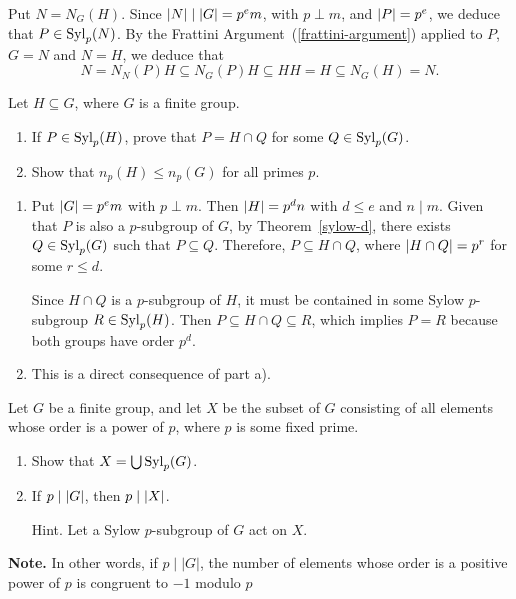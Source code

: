 \begin{solution} Put $N=N_G(H)$. Since $\left\vert{N}\right\vert\mid\left\vert{G}\right\vert=p^em$, with $p\perp m$, and $\left\vert{P}\right\vert=p^e$, we deduce that $P\in{\rm Syl}_p(N)$. By the Frattini Argument~(\ref{frattini-argument}) applied to $P$, $G=N$ and $N=H$, we deduce that
$$
    N=N_N(P)H\subseteq N_G(P)H\subseteq HH=H\subseteq N_G(H)=N.
$$
 \end{solution}

\begin{probl}\label{problem-1.C.2}
    Let $H \subseteq G$, where $G$ is a finite group.
    \begin{enumerate}[\upshape a)]
        \item If\/ $P\in{\rm Syl}_p(H)$, prove that $P=H\cap Q$ for some $Q\in {\rm Syl}_p(G)$.

        \item Show that $n_p(H) \le n_p(G)$ for all primes $p$.
    \end{enumerate}
\end{probl}

\begin{solution}
\begin{enumerate}[\upshape a)]
    \item Put $\left\vert{G}\right\vert=p^em$ with $p\perp m$. Then $\left\vert{H}\right\vert=p^dn$ with $d\le e$ and $n\mid m$.
    Given that $P$ is also a $p$-subgroup of $G$, by Theorem~\ref{sylow-d}, there exists $Q\in{\rm Syl}_p(G)$ such that $P\subseteq Q$. Therefore, $P\subseteq H\cap Q$, where $\left\vert{H\cap Q}\right\vert=p^r$ for some $r\le d$.

    Since $H\cap Q$ is a $p$-subgroup of $H$, it must be contained in some Sylow $p$-subgroup $R\in{\rm Syl}_p(H)$. Then $P\subseteq H\cap Q\subseteq R$, which implies $P=R$ because both groups have order $p^d$.
    
    \item This is a direct consequence of part a).
\end{enumerate}
\end{solution}

\begin{probl}\label{problem-1.C.3}
    Let\/ $G$ be a finite group, and let $X$ be the subset of\/ $G$ consisting of all elements whose order is a power of\/ $p$, where $p$ is some fixed prime.
    \begin{enumerate}[\upshape a)]
        \item Show that $X = \bigcup{\rm Syl}_p(G)$.
        \item If\/ $p\mid\left\vert{G}\right\vert$, then $p\mid\left\vert{X}\right\vert$.
        
        \textrm{\upshape Hint. Let a Sylow $p$-subgroup of $G$ act on $X$.}
    \end{enumerate}

    \textrm{\upshape\textbf{Note.} In other words, if $p\mid|G|$, the number of elements whose order is a positive power of $p$ is congruent to $-1$ modulo $p$}
\end{probl}

